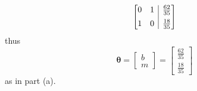 \documentclass[189]{pset}
\makeatletter
\newenvironment{amatrix}[1]{%
  \left[\begin{array}{@{}*{#1}{c}|c@{}}
}{%
  \end{array}\right]
}
\makeatother
\begin{document}
\begin{enumerate}
\begin{align*}
        \begin{amatrix}{2}
          0 & 1 & \frac{62}{35} \\[.5em]
          1 & 0 & \frac{18}{35}
        \end{amatrix}
      \end{align*}
      thus
      \[
        \bm{\theta} =
        \begin{bmatrix}
          b \\
          m
        \end{bmatrix}
        =
        \begin{bmatrix}
          \frac{62}{35} \\[.5em]
          \frac{18}{35}
        \end{bmatrix}
      \]
      as in part (a).
  \end{enumerate}
\end{document}
